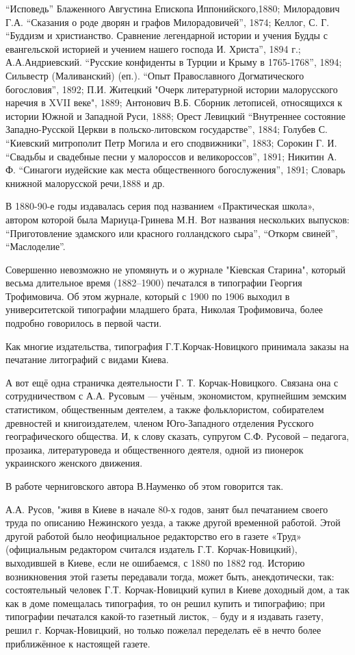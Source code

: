 \enquote{Исповедь} Блаженного Августина Епископа Иппонийского,1880; Милорадович Г.А.
\enquote{Сказания о роде дворян и графов Милорадовичей}, 1874; Келлог, С. Г. \enquote{Буддизм и
христианство. Сравнение легендарной истории и учения Будды с евангельской
историей и учением нашего господа И. Христа}, 1894 г.; А.А.Андриевский.
\enquote{Русские конфиденты в Турции и Крыму в 1765-1768}, 1894; Сильвестр
(Маливанский) (еп.). \enquote{Опыт Православного Догматического богословия}, 1892; П.И.
Житецкий "Очерк литературной истории малорусского наречия в XVII веке", 1889;
Антонович В.Б. Сборник летописей, относящихся к истории Южной и Западной Руси,
1888; Орест Левицкий \enquote{Внутреннее состояние Западно-Русской Церкви в
польско-литовском государстве}, 1884; Голубев С. \enquote{Киевский митрополит Петр
Могила и его сподвижники}, 1883; Сорокин Г. И. \enquote{Свадьбы и свадебные песни у
малороссов и великороссов}, 1891; Никитин А. Ф. \enquote{Синагоги иудейские как места
общественного богослужения}, 1891; Словарь книжной малорусской речи,1888 и др.  

В 1880-90-е годы издавалась серия под названием «Практическая школа», автором
которой была Мариуца-Гринева М.Н. Вот названия нескольких выпусков:
\enquote{Приготовление эдамского или красного голландского сыра}, \enquote{Откорм свиней},
\enquote{Маслоделие}.

Совершенно невозможно не упомянуть и о журнале "Кіевская Старина", который
весьма длительное время (1882–1900) печатался в типографии Георгия Трофимовича.
Об этом  журнале, который с 1900 по 1906 выходил в университетской типографии
младшего брата, Николая Трофимовича, более подробно говорилось в первой части. 

Как многие издательства, типография Г.Т.Корчак-Новицкого принимала заказы на
печатание литографий с видами Киева.

А вот ещё одна страничка деятельности Г. Т. Корчак-Новицкого. Связана она с
сотрудничеством с А.А. Русовым — учёным, экономистом, крупнейшим земским
статистиком, общественным деятелем, а также фольклористом, собирателем
древностей и книгоиздателем, членом Юго-Западного отделения Русского
географического общества. И, к слову сказать, супругом  С.Ф. Русовой ‒
педагога, прозаика, литературоведа и общественного деятеля, одной из пионерок
украинского женского движения.

В работе черниговского автора В.Науменко об этом говорится так. 

А.А. Русов, "живя в Киеве в начале 80-х годов, занят был печатанием своего
труда по описанию Нежинского уезда, а также другой временной работой. Этой
другой работой было неофициальное редакторство его в газете «Труд» (официальным
редактором считался издатель Г.Т. Корчак-Новицкий), выходившей в Киеве, если не
ошибаемся, с 1880 по 1882 год. Историю возникновения этой газеты передавали
тогда, может быть, анекдотически, так: состоятельный человек Г.Т.
Корчак-Новицкий купил в Киеве доходный дом, а так как в доме помещалась
типография, то он решил купить и типографию; при типографии печатался какой-то
газетный листок, – буду и я издавать газету, решил г. Корчак-Новицкий, но
только пожелал переделать её в нечто более приближённое к настоящей газете.

